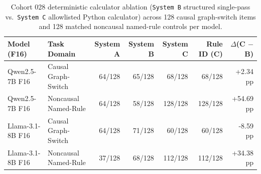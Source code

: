 \begin{table}[htbp]
\centering
\footnotesize
\caption{Cohort 028 deterministic calculator ablation (\texttt{System B} structured single-pass vs.\ \texttt{System C} allowlisted Python calculator) across 128 causal graph-switch items and 128 matched noncausal named-rule controls per model.}\label{tab:c28_ablation}
\begin{tabular}{@{}llrrrrr@{}}
\toprule
\textbf{Model (F16)} & \textbf{Task Domain} & \textbf{System A} & \textbf{System B} & \textbf{System C} & \textbf{Rule ID (C)} & \textbf{$\Delta$(C $-$ B)} \\
\midrule
Qwen2.5-7B F16 & Causal Graph-Switch & 64/128 & 65/128 & 68/128 & 68/128 & +2.34 pp \\
Qwen2.5-7B F16 & Noncausal Named-Rule & 64/128 & 58/128 & 128/128 & 128/128 & +54.69 pp \\
Llama-3.1-8B F16 & Causal Graph-Switch & 64/128 & 71/128 & 60/128 & 60/128 & -8.59 pp \\
Llama-3.1-8B F16 & Noncausal Named-Rule & 37/128 & 68/128 & 112/128 & 112/128 & +34.38 pp \\
\bottomrule
\end{tabular}
\end{table}